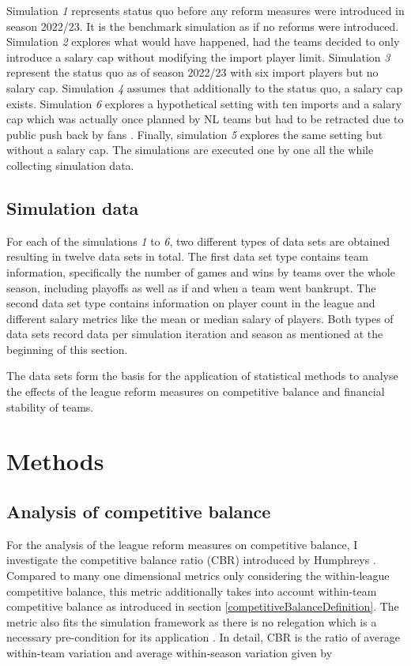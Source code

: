 \documentclass[12pt, a4paper]{article}
\begin{document}
\noindent
Simulation \textit{1} represents status quo before any reform measures were introduced in season 2022/23. It is the benchmark simulation as if no reforms were introduced. Simulation \textit{2} explores what would have happened, had the teams decided to only introduce a salary cap without modifying the import player limit. Simulation \textit{3} represent the status quo as of season 2022/23 with six import players but no salary cap. Simulation \textit{4} assumes that additionally to the status quo, a salary cap exists. Simulation \textit{6} explores a hypothetical setting with ten imports and a salary cap which was actually once planned by NL teams but had to be retracted due to public push back by fans \citep[][]{noauthor_fan-aufstand_2020}. Finally, simulation \textit{5} explores the same setting but without a salary cap. The simulations are executed one by one all the while collecting simulation data.

\subsection{Simulation data}

For each of the simulations \textit{1} to \textit{6}, two different types of data sets are obtained resulting in twelve data sets in total. The first data set type contains team information, specifically the number of games and wins by teams over the whole season, including playoffs as well as if and when a team went bankrupt. The second data set type contains information on player count in the league and different salary metrics like the mean or median salary of players. Both types of data sets record data per simulation iteration and season as mentioned at the beginning of this section. 

\noindent
The data sets form the basis for the application of statistical methods to analyse the effects of the league reform measures on competitive balance and financial stability of teams.  

\section{Methods}

\subsection{Analysis of competitive balance}

For the analysis of the league reform measures on competitive balance, I investigate the competitive balance ratio (CBR) introduced by Humphreys \citep[][]{humphreys_alternative_2002}. Compared to many one dimensional metrics only considering the within-league competitive balance, this metric additionally takes into account within-team competitive balance as introduced in section \ref{competitiveBalanceDefinition}. The metric also fits the simulation framework as there is no relegation which is a necessary pre-condition for its application \citep[see][]{goossens_competitive_2005}. In detail, CBR is the ratio of average within-team variation and average within-season variation given by
\end{document}
